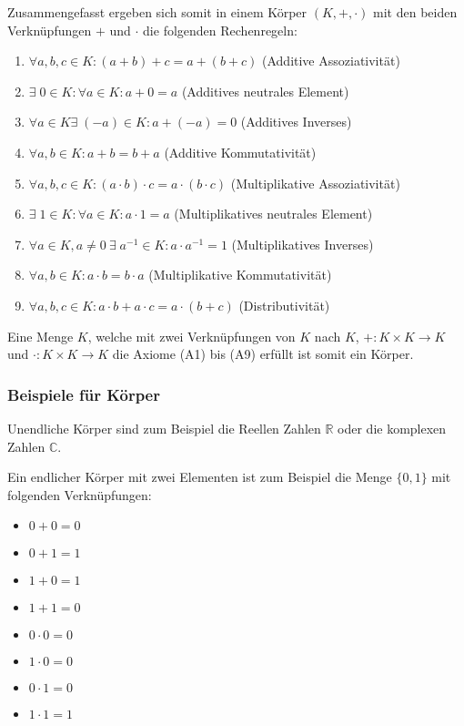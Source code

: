 \documentclass{article}
\begin{document}
Zusammengefasst ergeben sich somit in einem Körper $(K, +, \cdot)$ mit den beiden Verknüpfungen $+$
und $\cdot$ die folgenden Rechenregeln:

\begin{enumerate}[label=(A\arabic*)]
\item \label{a1} $\forall a,b,c \in K \colon (a + b) + c = a + (b + c)$
  (Additive Assoziativität)
\item \label{a2} $\exists \; 0 \in K \colon \forall a \in K \colon a + 0 = a$
  (Additives neutrales Element)
\item \label{a3} $\forall a \in K \exists \; (-a) \in K \colon a + (-a) = 0$
  (Additives Inverses)
\item \label{a4} $\forall a,b \in K \colon a + b = b + a$
  (Additive Kommutativität)
\item \label{a5} $\forall a,b,c \in K \colon (a \cdot b) \cdot c = a \cdot (b \cdot c)$
  (Multiplikative Assoziativität)
\item \label{a6} $\exists \; 1 \in K \colon \forall a \in K \colon a \cdot 1 = a$
  (Multiplikatives neutrales Element)
\item \label{a7} $\forall a \in K, a \ne 0 \: \exists \; a^{-1} \in K \colon a \cdot a^{-1} = 1$
  (Multiplikatives Inverses)
\item \label{a8} $\forall a,b \in K \colon a \cdot b = b \cdot a$
  (Multiplikative Kommutativität)
\item \label{a9} $\forall a,b,c \in K \colon a \cdot b + a \cdot c = a \cdot (b + c)$
  (Distributivität)
\end{enumerate}

Eine Menge $K$, welche mit zwei Verknüpfungen von $K$ nach $K$, $+\colon K \times K \to K$ und
$\cdot\colon K \times K \to K$ die Axiome (A1) bis (A9) erfüllt ist somit ein Körper.

\subsubsection*{Beispiele für Körper}

Unendliche Körper sind zum Beispiel die Reellen Zahlen $\mathbb{R}$ oder die komplexen Zahlen $\mathbb{C}$.

Ein endlicher Körper mit zwei Elementen ist zum Beispiel die Menge $\{ 0, 1\}$ mit folgenden Verknüpfungen:

\begin{itemize}
\item $0 + 0 = 0$
\item $0 + 1 = 1$
\item $1 + 0 = 1$
\item $1 + 1 = 0$
\item $0 \cdot 0 = 0$
\item $1 \cdot 0 = 0$
\item $0 \cdot 1 = 0$
\item $1 \cdot 1 = 1$
\end{itemize}
\end{document}
